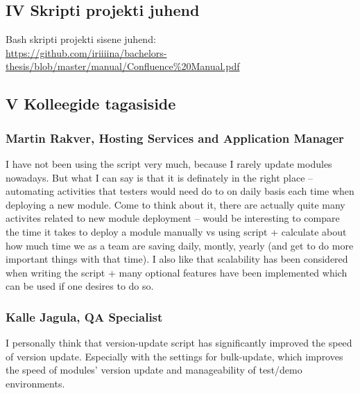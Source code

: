 \documentclass[12pt]{report}
\begin{document}
  \subsection*{IV Skripti projekti juhend}
  \label{documentation}
  
  Bash skripti projekti sisene juhend:\\
  \url{https://github.com/iriiiina/bachelors-thesis/blob/master/manual/Confluence%20Manual.pdf}
  
  \subsection*{V Kolleegide tagasiside}
  \label{feedback}
  
  \subsubsection{Martin Rakver, Hosting Services and Application Manager}
  
  \begin{displayquote}
  I have not been using the script very much, because I rarely update modules nowadays. But what I can say is that it is definately in the right place – automating activities that testers would need do to on daily basis each time when deploying a new module. Come to think about it, there are actually quite many activites related to new module deployment – would be interesting to compare the time it takes to deploy a module manually vs using script + calculate about how much time we as a team are saving daily, montly, yearly (and get to do more important things with that time).
I also like that scalability has been considered when writing the script + many optional features have been implemented which can be used if one desires to do so.
  \end{displayquote}

  \subsubsection{Kalle Jagula, QA Specialist}
  
  \begin{displayquote}
  I personally think that version-update script has significantly improved the speed of version update. Especially with the settings for bulk-update, which improves the speed of modules' version update and manageability of test/demo environments.
  \end{displayquote}
  
\end{document}
